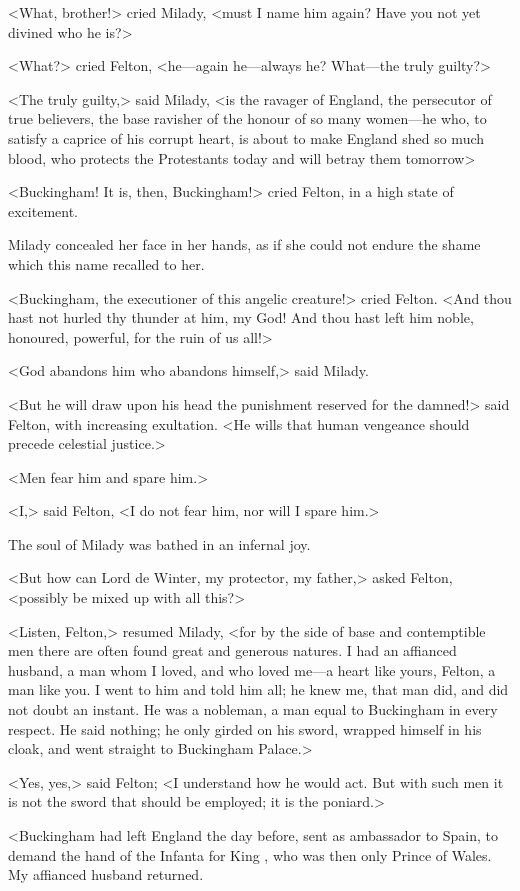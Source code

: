 <What, brother!> cried Milady, <must I name him again? Have you not yet divined who he is?> 

<What?> cried Felton, <he—again he—always he? What—the truly guilty?> 

<The truly guilty,> said Milady, <is the ravager of England, the persecutor of true believers, the base ravisher of the honour of so many women—he who, to satisfy a caprice of his corrupt heart, is about to make England shed so much blood, who protects the Protestants today and will betray them tomorrow\longdash> 

<Buckingham! It is, then, Buckingham!> cried Felton, in a high state of excitement. 

Milady concealed her face in her hands, as if she could not endure the shame which this name recalled to her. 

<Buckingham, the executioner of this angelic creature!> cried Felton. <And thou hast not hurled thy thunder at him, my God! And thou hast left him noble, honoured, powerful, for the ruin of us all!> 

<God abandons him who abandons himself,> said Milady. 

<But he will draw upon his head the punishment reserved for the damned!> said Felton, with increasing exultation. <He wills that human vengeance should precede celestial justice.> 

<Men fear him and spare him.> 

<I,> said Felton, <I do not fear him, nor will I spare him.> 

The soul of Milady was bathed in an infernal joy. 

<But how can Lord de Winter, my protector, my father,> asked Felton, <possibly be mixed up with all this?> 

<Listen, Felton,> resumed Milady, <for by the side of base and contemptible men there are often found great and generous natures. I had an affianced husband, a man whom I loved, and who loved me—a heart like yours, Felton, a man like you. I went to him and told him all; he knew me, that man did, and did not doubt an instant. He was a nobleman, a man equal to Buckingham in every respect. He said nothing; he only girded on his sword, wrapped himself in his cloak, and went straight to Buckingham Palace.>

<Yes, yes,> said Felton; <I understand how he would act. But with such men it is not the sword that should be employed; it is the poniard.> 

<Buckingham had left England the day before, sent as ambassador to Spain, to demand the hand of the Infanta for King , who was then only Prince of Wales. My affianced husband returned. 

